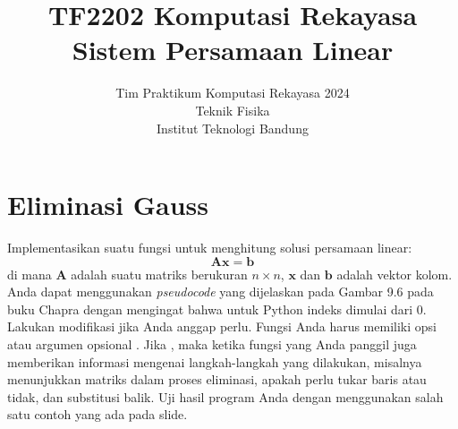



\title{%
{\small TF2202 Komputasi Rekayasa}\\
Sistem Persamaan Linear
}
\author{Tim Praktikum Komputasi Rekayasa 2024\\
Teknik Fisika\\
Institut Teknologi Bandung}
\date{}
\maketitle


\section{Eliminasi Gauss}

\begin{soal}
Implementasikan suatu fungsi untuk menghitung solusi persamaan linear:
\begin{equation*}
\mathbf{A}\mathbf{x} = \mathbf{b}
\end{equation*}
di mana $\mathbf{A}$ adalah suatu matriks berukuran $n \times n$, 
$\mathbf{x}$ dan $\mathbf{b}$ adalah vektor kolom.
Anda dapat menggunakan \textit{pseudocode} yang dijelaskan pada Gambar 9.6
pada buku Chapra dengan mengingat bahwa untuk Python indeks dimulai dari 0.
Lakukan modifikasi jika Anda anggap perlu.
Fungsi Anda harus memiliki opsi atau argumen opsional .
Jika , maka ketika fungsi yang Anda panggil juga
memberikan informasi mengenai langkah-langkah yang dilakukan, misalnya
menunjukkan matriks dalam proses eliminasi, apakah perlu tukar baris atau tidak,
dan substitusi balik. Uji hasil program Anda dengan menggunakan salah satu contoh
yang ada pada slide.
\end{soal}

